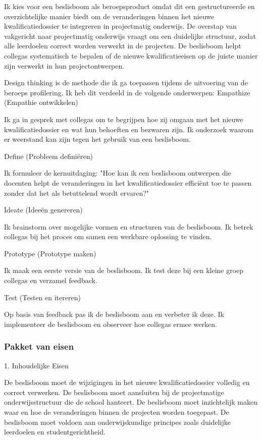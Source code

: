 Ik kies voor een beslisboom als beroepsproduct omdat dit een gestructureerde en overzichtelijke manier biedt om de veranderingen binnen het nieuwe kwalificatiedossier te integreren in projectmatig onderwijs. De overstap van vakgericht naar projectmatig onderwijs vraagt om een duidelijke structuur, zodat alle leerdoelen correct worden verwerkt in de projecten. De beslisboom helpt collega\textquotesingle s
 systematisch te bepalen of de nieuwe kwalificatieeisen op de juiste manier zijn verwerkt in hun projectontwerpen.

Design thinking is de methode die ik ga toepassen tijdens de uitvoering van de beroeps profilering. Ik heb dit verdeeld in de volgende onderwerpen:
Empathize (Empathie ontwikkelen)

    Ik ga in gesprek met collega\textquotesingle s
 om te begrijpen hoe zij omgaan met het nieuwe kwalificatiedossier en wat hun behoeften en bezwaren zijn.
    Ik onderzoek waarom er weerstand kan zijn tegen het gebruik van een beslisboom.

Define (Probleem definiëren)

    Ik formuleer de kernuitdaging: "Hoe kan ik een beslisboom ontwerpen die docenten helpt de veranderingen in het kwalificatiedossier efficiënt toe te passen zonder dat het als betuttelend wordt ervaren?"

Ideate (Ideeën genereren)

    Ik brainstorm over mogelijke vormen en structuren van de beslisboom.
    Ik betrek collega\textquotesingle s
 bij het proces om samen een werkbare oplossing te vinden.

Prototype (Prototype maken)

    Ik maak een eerste versie van de beslisboom.
    Ik test deze bij een kleine groep collega\textquotesingle s
 en verzamel feedback.

Test (Testen en itereren)

    Op basis van feedback pas ik de beslisboom aan en verbeter ik deze.
    Ik implementeer de beslisboom en observeer hoe collega\textquotesingle s
 ermee werken.
\subsubsection{Pakket van eisen}    
1. Inhoudelijke Eisen

    De beslisboom moet de wijzigingen in het nieuwe kwalificatiedossier volledig en correct verwerken.
    De beslisboom moet aansluiten bij de projectmatige onderwijsstructuur die de school hanteert.
    De beslisboom moet inzichtelijk maken waar en hoe de veranderingen binnen de projecten worden toegepast.
    De beslisboom moet voldoen aan onderwijskundige principes zoals duidelijke leerdoelen en studentgerichtheid.

